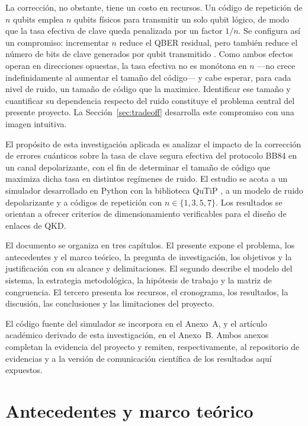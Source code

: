 \documentclass[12pt]{report}
\begin{document}
La corrección, no obstante, tiene un costo en recursos. Un código de repetición
de $n$ qubits emplea $n$ qubits físicos para transmitir un solo qubit lógico, de
modo que la tasa efectiva de clave queda penalizada por un factor $1/n$. Se
configura así un compromiso: incrementar $n$ reduce el QBER residual, pero
también reduce el número de bits de clave generados por qubit transmitido
\citep{fowler2012, jayachandran2025}. Como ambos efectos operan en direcciones
opuestas, la tasa efectiva no es monótona en $n$ —no crece indefinidamente al
aumentar el tamaño del código— y cabe esperar, para cada nivel de ruido, un
tamaño de código que la maximice. Identificar ese tamaño y cuantificar su
dependencia respecto del ruido constituye el problema central del presente
proyecto. La Sección~\ref{sec:tradeoff} desarrolla este compromiso con una imagen
intuitiva.

El propósito de esta investigación aplicada es analizar el impacto de la
corrección de errores cuánticos sobre la tasa de clave segura efectiva del
protocolo BB84 en un canal depolarizante, con el fin de determinar el tamaño de
código que maximiza dicha tasa en distintos regímenes de ruido. El estudio se
acota a un simulador desarrollado en Python con la biblioteca QuTiP
\citep{qutip2012}, a un modelo de ruido depolarizante y a códigos de repetición
con $n \in \{1, 3, 5, 7\}$. Los resultados se orientan a ofrecer criterios de
dimensionamiento verificables para el diseño de enlaces de QKD.

El documento se organiza en tres capítulos. El presente expone el problema, los
antecedentes y el marco teórico, la pregunta de investigación, los objetivos y
la justificación con su alcance y delimitaciones. El segundo describe el modelo
del sistema, la estrategia metodológica, la hipótesis de trabajo y la matriz de
congruencia. El tercero presenta los recursos, el cronograma, los resultados, la
discusión, las conclusiones y las limitaciones del proyecto.

El código fuente del simulador se incorpora en el Anexo~A, y el artículo
académico derivado de esta investigación, en el Anexo~B. Ambos anexos completan
la evidencia del proyecto y remiten, respectivamente, al repositorio de
evidencias y a la versión de comunicación científica de los resultados aquí
expuestos.

\section{Antecedentes y marco teórico}
\end{document}
